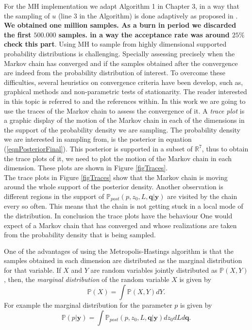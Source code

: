 \documentclass[12pt]{book}
\newcommand{\post}{\mathbb{P}_{post}}
\newcommand{\p}{\mathbb{P}}
\newcommand{\q}{\textbf{q}}
\newcommand{\pars}{p,z_{0},L}
\newcommand{\y}{\textbf{y}}
\begin{document}
For the MH implementation we adapt Algorithm 1 in Chapter 3, in a way
that the sampling of $u$ (line 3 in the Algorithm) is done adaptively as proposed in \cite{roberts2009examples}.
\textbf{We obtained one million samples. As a burn in period we discarded the first $500.000$ samples. 
in a way the acceptance rate was around $25\%$ check this part}.
Using MH to sample
from highly dimensional supported probability distributions is challenging. Specially assessing precisely
when the Markov chain has converged and if the samples obtained after the convergence are indeed from
the probability distribution of interest. To overcome these difficulties, several heuristics on convergence
criteria have been develop, such as, graphical methods and non-parametric tests of stationarity. The reader
interested in this topic is referred to \cite{casella2008monte} and the references within. 
In this work we are going to use the traces of the Markov chain to assess the convergence of it. 
A \textit{trace plot} is a graphic display of the motion of the Markov chain in each
of the dimensions in the support of the probability density we are sampling. 
The probability density we are interested in sampling from, is the  posterior in equation (\ref{eqnPosteriorFinal}). 
This posterior is supported in a  subset of $\mathbb{R}^{7}$, thus to obtain the trace plots
of it, we need to plot the motion of the Markov chain in each dimension. These plots
are shown in Figure \ref{figTraces}. 
\\
The trace plots in Figure \ref{figTraces} show that the Markov chain is moving around the whole 
support of the posterior density. Another observation is different regions in the support
of $\post(\pars,\q|\y)$ are visited by the chain every so often. This means
that the chain is not getting stuck in a local mode of the distribution. In conclusion the 
trace plots have the behaviour One would expect of a Markov chain that has converged
and whose realizations are taken from the probability density that is being sampled. 

One of the advantages of using the Metropolis-Hastings algorithm is that the samples
obtained in each dimension are distributed as the marginal distribution
for that variable. If $X$ and $Y$ are random variables jointly distributed 
as $\p(X,Y)$, then,
the \textit{marginal distribution} of the random variable $X$ is given by
\begin{equation*}
\p(X)=\int\p(X,Y)dY.
\end{equation*}
For example the marginal distribution for the parameter $p$ is given by
\begin{equation*}
\p(p|\y)=\int\post(\pars,\q|\y)dz_{0}dLd\q.
\end{equation*}
\end{document}
